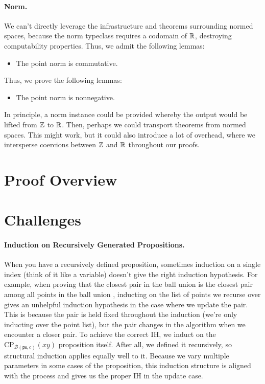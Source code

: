\documentclass{article}
\begin{document}
\paragraph{Norm.}
We can't directly leverage the infrastructure and theorems surrounding normed spaces, because the norm typeclass requires a codomain of $\mathbb{R}$, destroying computability properties.
Thus, we admit the following lemmas:
\begin{itemize}
  \item The point norm is commutative.
\end{itemize}
Thus, we prove the following lemmas:
\begin{itemize}
  \item The point norm is nonnegative.
\end{itemize}
In principle, a norm instance could be provided whereby the output would be lifted from $\mathbb{Z}$ to $\mathbb{R}$.
Then, perhaps we could transport theorems from normed spaces.
This might work, but it could also introduce a lot of overhead, where we intersperse coercions between $\mathbb{Z}$ and $\mathbb{R}$ throughout our proofs.

\section{Proof Overview}

\section{Challenges}
\paragraph{Induction on Recursively Generated Propositions.}
When you have a recursively defined proposition, sometimes induction on a single index (think of it like a variable) doesn't give the right induction hypothesis.
For example, when proving that the closest pair in the ball union is the closest pair among all points in the ball union , inducting on the list of points we recurse over gives an unhelpful induction hypothesis in the case where we update the pair.
This is because the pair is held fixed throughout the induction (we're only inducting over the point list), but the pair changes in the algorithm when we encounter a closer pair.
To achieve the correct IH, we induct on the $\text{CP}_{\mathcal{B}(\mathsf{ps}, c)}(xy)$ proposition itself.
After all, we defined it recursively, so structural induction applies equally well to it.
Because we vary multiple parameters in some cases of the proposition, this induction structure is aligned with the process and gives us the proper IH in the update case.
\end{document}
